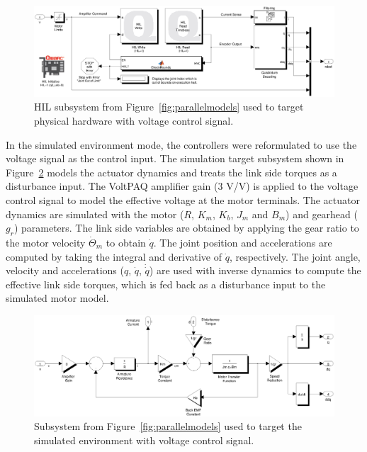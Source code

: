 \begin{figure}[!h]
	\centering
    \includegraphics[scale=0.5]{fig/experiments/hilmodel.eps} 
  	\caption{HIL subsystem from Figure~\ref{fig:parallelmodels} used to target physical hardware with voltage control signal.}
	\label{fig:hilmodel}
\end{figure}

In the simulated environment mode, the controllers were reformulated to use the voltage signal as the control input. The simulation target subsystem shown in Figure~\ref{fig:simmodel} models the actuator dynamics and treats the link side torques as a disturbance input. The VoltPAQ amplifier gain ($3$ V/V) is applied to the voltage control signal to model the effective voltage at the motor terminals. The actuator dynamics are simulated with the motor ($R$, $K_m$, $K_b$, $J_m$ and $B_m$) and gearhead ($g_r$) parameters. The link side variables are obtained by applying the gear ratio to the motor velocity $\dot{\Theta}_m$ to obtain $\dot{q}$. The joint position and accelerations are computed by taking the integral and derivative of $\dot{q}$, respectively. The joint angle, velocity and accelerations ($q$, $\dot{q}$, $\dot{\dot{q}}$) are used with inverse dynamics to compute the effective link side torques, which is fed back as a disturbance input to the simulated motor model. 

\begin{figure}[!h]
	\centering
    \includegraphics[scale=0.5]{fig/experiments/simmodel.eps} 
  	\caption{Subsystem from Figure~\ref{fig:parallelmodels} used to target the simulated environment with voltage control signal.}
	\label{fig:simmodel}
\end{figure}


